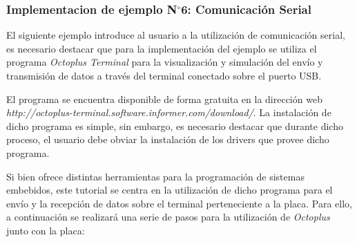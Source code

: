 \documentclass[12pt,letterpaper]{article}
\begin{document}
\subsubsection{Implementacion de ejemplo N$^{\circ}$6: Comunicación Serial}
El siguiente ejemplo introduce al usuario a la utilización de comunicación serial, es necesario destacar que para la implementación del ejemplo se utiliza el programa \textit{Octoplus Terminal} para la visualización y simulación del envío y transmisión de datos a través del terminal conectado sobre el puerto USB.

El programa se encuentra disponible de forma gratuita en la dirección web \textit{http://octoplus-terminal.software.informer.com/download/}. La instalación de dicho programa es simple, sin embargo, es necesario destacar que durante dicho proceso, el usuario debe obviar la instalación de los drivers que provee dicho programa.

Si bien ofrece distintas herramientas para la programación de sistemas embebidos, este tutorial se centra en la utilización de dicho programa para el envío y la recepción de datos sobre el terminal perteneciente a la placa. Para ello, a continuación se realizará una serie de pasos para la utilización de \textit{Octoplus} junto con la placa:
\end{document}
